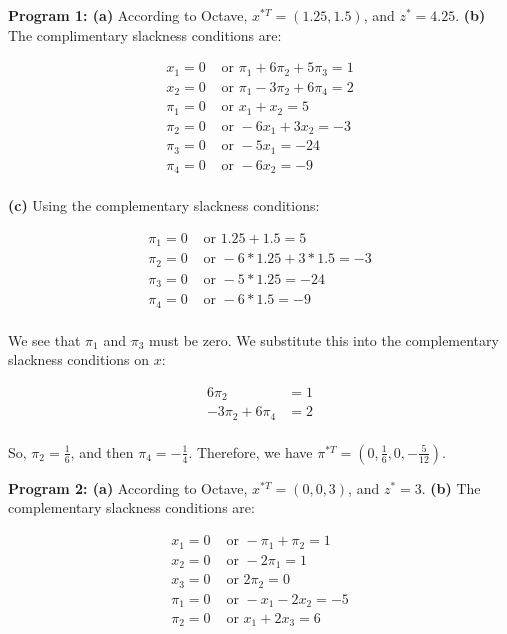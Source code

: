 \documentclass[fleqn]{homework}
\begin{document}
\begin{problem}{2}
    \textbf{Program 1: (a)} According to Octave, $x^{*T} = (1.25, 1.5)$, and
    $z^* = 4.25$.  \textbf{(b)} The complimentary slackness conditions are:

    \begin{align*}
      x_1 = 0 &\text{ or } \pi_1 + 6\pi_2 + 5\pi_3 = 1 \\
      x_2 = 0 &\text{ or } \pi_1 - 3\pi_2 + 6 \pi_4 = 2 \\
      \pi_1 = 0 &\text{ or } x_1 + x_2 = 5 \\
      \pi_2 = 0 &\text{ or } -6x_1 + 3x_2 = -3 \\
      \pi_3 = 0 &\text{ or } -5x_1 = -24 \\
      \pi_4 = 0 &\text{ or } -6x_2 = -9 \\
    \end{align*}

    \textbf{(c)} Using the complementary slackness conditions:

    \begin{align*}
      \pi_1 = 0 &\text{ or } 1.25 + 1.5 = 5 \\
      \pi_2 = 0 &\text{ or } -6*1.25 + 3*1.5 = -3 \\
      \pi_3 = 0 &\text{ or } -5*1.25 = -24 \\
      \pi_4 = 0 &\text{ or } -6*1.5 = -9 \\
    \end{align*}

    We see that $\pi_1$ and $\pi_3$ must be zero.  We substitute this into the
    complementary slackness conditions on $x$:

    \begin{align*}
      6\pi_2 &= 1 \\
      -3\pi_2 + 6 \pi_4 &= 2 \\
    \end{align*}

    So, $\pi_2 = \frac{1}{6}$, and then $\pi_4 = -\frac{1}{4}$.  Therefore, we
    have $\pi^{*T} = (0, \frac{1}{6}, 0, -\frac{5}{12})$.

    \textbf{Program 2: (a)} According to Octave, $x^{*T} = (0, 0, 3)$, and
    $z^* = 3$.  \textbf{(b)} The complementary slackness conditions are:

    \begin{align*}
      x_1 = 0 &\text{ or } -\pi_1 + \pi_2 = 1 \\
      x_2 = 0 &\text{ or } -2\pi_1 = 1 \\
      x_3 = 0 &\text{ or } 2\pi_2 = 0 \\
      \pi_1 = 0 &\text{ or } -x_1 - 2x_2 = -5 \\
      \pi_2 = 0 &\text{ or } x_1 + 2x_3 = 6 \\
    \end{align*}


\end{problem}
\end{document}
